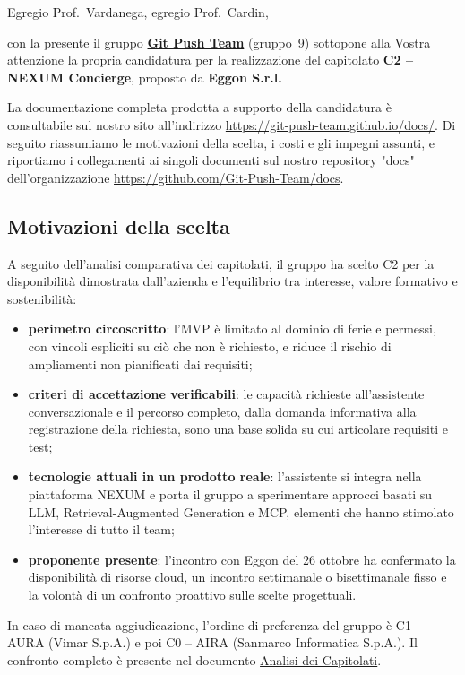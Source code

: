\documentclass[lettera]{gpt}
\newcommand{\pdfdoc}[2]{\href{https://github.com/Git-Push-Team/docs/blob/main/Candidatura/#1}{#2}}
\begin{document}
Egregio Prof.~Vardanega, egregio Prof.~Cardin,

con la presente il gruppo \href{https://github.com/Git-Push-Team/}{\textbf{Git Push Team}} (gruppo~9) sottopone alla
Vostra attenzione la propria candidatura per la realizzazione del
capitolato \textbf{C2 -- NEXUM Concierge}, proposto da \textbf{Eggon S.r.l.}

La documentazione completa prodotta a supporto della candidatura è consultabile sul nostro sito
all'indirizzo \url{https://git-push-team.github.io/docs/}. Di seguito
riassumiamo le motivazioni della scelta, i costi e gli impegni assunti, e
riportiamo i collegamenti ai singoli documenti sul nostro repository "docs" dell'organizzazione \url{https://github.com/Git-Push-Team/docs}.

\subsection*{Motivazioni della scelta}

A seguito dell'analisi comparativa dei capitolati, il gruppo ha scelto C2
per la disponibilità dimostrata dall'azienda e l'equilibrio tra interesse, valore formativo e sostenibilità:
\begin{itemize}
  \item \textbf{perimetro circoscritto}: l'MVP è
        limitato al dominio di ferie e permessi, con vincoli espliciti su
        ciò che non è richiesto, e riduce il rischio di ampliamenti
        non pianificati dai requisiti;
  \item \textbf{criteri di accettazione verificabili}: le capacità
        richieste all'assistente conversazionale e il percorso completo, dalla domanda
        informativa alla registrazione della richiesta, sono una base
        solida su cui articolare requisiti e test;
  \item \textbf{tecnologie attuali in un prodotto reale}: l'assistente
        si integra nella piattaforma NEXUM e porta il
        gruppo a sperimentare approcci basati su LLM, Retrieval-Augmented Generation e MCP, elementi che hanno stimolato l'interesse di tutto il team;
  \item \textbf{proponente presente}: l'incontro con Eggon del 26 ottobre
        ha confermato la disponibilità di risorse cloud, un incontro
        settimanale o bisettimanale fisso e la volontà di un confronto proattivo sulle
        scelte progettuali.
\end{itemize}
In caso di mancata aggiudicazione, l'ordine di preferenza del gruppo è
C1 -- AURA (Vimar S.p.A.) e poi C0 -- AIRA (Sanmarco Informatica S.p.A.).
Il confronto completo è presente nel documento
\pdfdoc{documenti/esterni/analisi-dei-capitolati/analisi-dei-capitolati.pdf}{Analisi dei Capitolati}.
\end{document}

